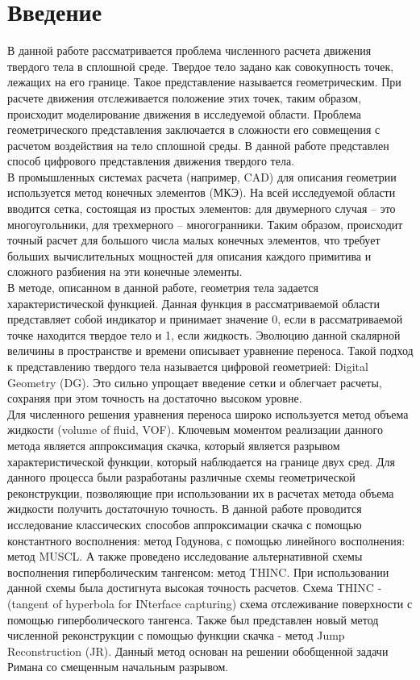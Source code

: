 \documentclass[12pt,a4paper]{article}
\begin{document}
\section{Введение}
В данной работе рассматривается проблема численного расчета движения твердого тела в сплошной среде. Твердое тело задано как совокупность точек, лежащих на его границе. Такое представление называется геометрическим. При расчете движения отслеживается положение этих точек, таким образом, происходит моделирование движения в исследуемой области. Проблема геометрического представления заключается в сложности его совмещения с расчетом воздействия на тело сплошной среды. В данной работе представлен способ цифрового представления движения твердого тела.\\
В промышленных системах расчета (например, CAD) для описания геометрии используется метод конечных элементов (МКЭ). На всей исследуемой области вводится сетка, состоящая из простых элементов: для двумерного случая – это многоугольники, для трехмерного – многогранники. Таким образом, происходит точный расчет для большого числа малых конечных элементов, что требует больших вычислительных мощностей для описания каждого примитива и сложного разбиения на эти конечные элементы.\\
В методе, описанном в данной работе, геометрия тела задается характеристической функцией. Данная функция в рассматриваемой области представляет собой индикатор и принимает значение 0, если в рассматриваемой точке находится твердое тело и 1, если жидкость. Эволюцию данной скалярной величины в пространстве и времени описывает уравнение переноса. Такой подход к представлению твердого тела называется цифровой геометрией: Digital Geometry (DG). Это сильно упрощает введение сетки и облегчает расчеты, сохраняя при этом точность на достаточно высоком уровне.\\
Для численного решения уравнения переноса широко используется метод объема жидкости (volume of fluid, VOF). Ключевым моментом реализации данного метода является аппроксимация скачка, который является разрывом характеристической функции, который наблюдается на границе двух сред. Для данного процесса были разработаны различные схемы геометрической реконструкции, позволяющие при использовании их в расчетах метода объема жидкости получить достаточную точность. В данной работе проводится исследование классических способов аппроксимации скачка с помощью константного восполнения: метод Годунова, с помощью линейного восполнения: метод MUSCL. А также проведено исследование альтернативной схемы восполнения гиперболическим тангенсом: метод THINC. При использовании данной схемы была достигнута высокая точность расчетов. Схема THINC - (tangent of hyperbola for INterface capturing) схема отслеживание поверхности с помощью гиперболического тангенса. Также был представлен новый метод численной реконструкции с помощью функции скачка - метод Jump Reconstruction (JR). Данный метод основан на решении обобщенной задачи Римана со смещенным начальным разрывом.\\
\end{document}
